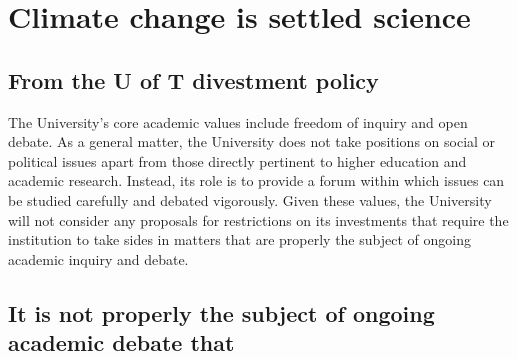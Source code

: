\documentclass[10pt]{article}
\newenvironment{itquote}{%
  \quote
  \itshape
}{%
  \endquote
}
\begin{document}

\clearpage

\tableofcontents

\clearpage






		\singlespacing
		\section{Climate change is settled science}
		\label{sec:SettledScience}
		\doublespacing





	
	\subsection{From the U of T divestment policy}



\begin{itquote}	
The University's core academic values include freedom of inquiry and open debate.
As a general matter, the University does not take positions on social or political issues apart from those directly pertinent to higher education and academic research. 
Instead, its role is to provide a forum within which issues can be studied carefully and debated vigorously. 
Given these values, the University will not consider any proposals for restrictions on its investments that require the institution to take sides in matters that are properly the subject of ongoing academic inquiry and debate.
\end{itquote}



	\subsection{It is not properly the subject of ongoing academic debate that}
\end{document}

